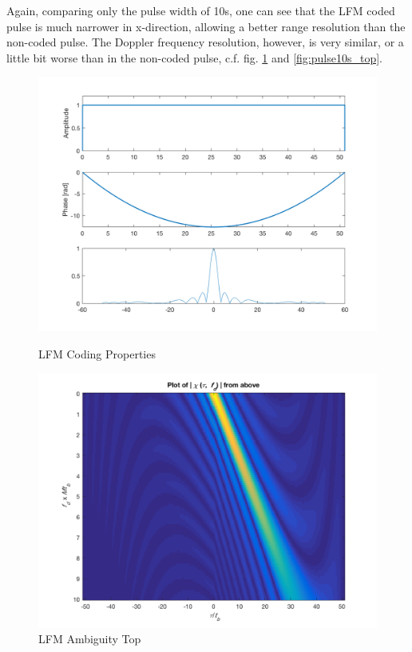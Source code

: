 Again, comparing only the pulse width of 10s, one can see that the LFM coded pulse is much narrower in x-direction, allowing a better range resolution than the non-coded pulse. The Doppler frequency resolution, however, is very similar, or a little bit worse than in the non-coded pulse, c.f. fig. \ref{fig:lfm_top} and \ref{fig:pulse10s_top}.

\begin{figure}[!htbp]
  \centering
  \begin{minipage}[b]{0.45\textwidth}
    \includegraphics[width=\textwidth]{images/lfm_props}
    \caption{LFM Coding Properties}
    \label{fig:lfm_props}
  \end{minipage}
  \hfill
  \begin{minipage}[b]{0.45\textwidth}
    \includegraphics[width=\textwidth]{images/lfm_top}
    \caption{LFM Ambiguity Top}
    \label{fig:lfm_top}
  \end{minipage}
\end{figure}


